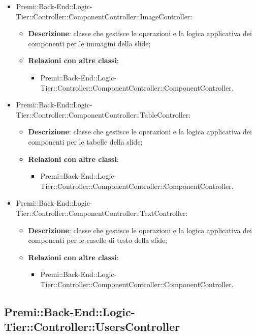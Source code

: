 \begin{itemize}
		\item Premi::Back-End::Logic-Tier::Controller::ComponentController::ImageController:
		\begin{itemize}
			\item \textbf{Descrizione}: classe che gestisce le operazioni e la logica applicativa dei componenti per le immagini della slide;
			\item \textbf{Relazioni con altre classi}:
			\begin{itemize}
				\item Premi::Back-End::Logic-Tier::Controller::ComponentController::ComponentController.
			\end{itemize}
		\end{itemize}
		
		\item Premi::Back-End::Logic-Tier::Controller::ComponentController::TableController:
		\begin{itemize}
			\item \textbf{Descrizione}: classe che gestisce le operazioni e la logica applicativa dei componenti per le tabelle della slide;
			\item \textbf{Relazioni con altre classi}:
			\begin{itemize}
				\item Premi::Back-End::Logic-Tier::Controller::ComponentController::ComponentController.
			\end{itemize}
		\end{itemize}
		
		\item Premi::Back-End::Logic-Tier::Controller::ComponentController::TextController:
		\begin{itemize}
			\item \textbf{Descrizione}: classe che gestisce le operazioni e la logica applicativa dei componenti per le caselle di testo della slide;
			\item \textbf{Relazioni con altre classi}:
			\begin{itemize}
				\item Premi::Back-End::Logic-Tier::Controller::ComponentController::ComponentController.
			\end{itemize}
		\end{itemize}
	\end{itemize}
	
\newpage
	
\subsection{Premi::Back-End::Logic-Tier::Controller::UsersController}
